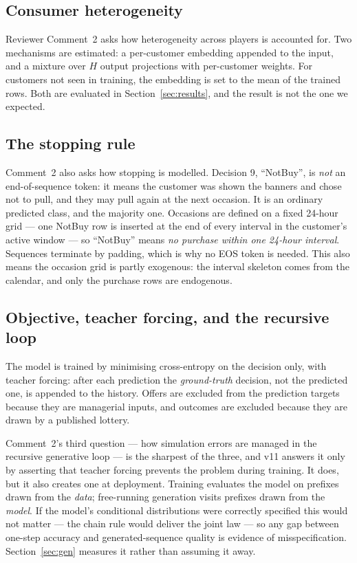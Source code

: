 \documentclass[11pt]{article}
\begin{document}
\subsection*{Consumer heterogeneity}

Reviewer Comment~2 asks how heterogeneity across players is accounted for. Two
mechanisms are estimated: a per-customer embedding appended to the input, and a
mixture over $H$ output projections with per-customer weights. For customers not
seen in training, the embedding is set to the mean of the trained rows. Both are
evaluated in Section~\ref{sec:results}, and the result is not the one we
expected.

\subsection*{The stopping rule}

Comment~2 also asks how stopping is modelled. Decision 9, ``NotBuy'', is
\emph{not} an end-of-sequence token: it means the customer was shown the
banners and chose not to pull, and they may pull again at the next occasion. It
is an ordinary predicted class, and the majority one. Occasions are defined on a
fixed 24-hour grid --- one NotBuy row is inserted at the end of every interval
in the customer's active window --- so ``NotBuy'' means \emph{no purchase within
one 24-hour interval}. Sequences terminate by padding, which is why no EOS token
is needed. This also means the occasion grid is partly exogenous: the interval
skeleton comes from the calendar, and only the purchase rows are endogenous.

\subsection*{Objective, teacher forcing, and the recursive loop}

The model is trained by minimising cross-entropy on the decision only, with
teacher forcing: after each prediction the \emph{ground-truth} decision, not the
predicted one, is appended to the history. Offers are excluded from the
prediction targets because they are managerial inputs, and outcomes are excluded
because they are drawn by a published lottery.

Comment~2's third question --- how simulation errors are managed in the
recursive generative loop --- is the sharpest of the three, and v11 answers it
only by asserting that teacher forcing prevents the problem during training. It
does, but it also creates one at deployment. Training evaluates the model on
prefixes drawn from the \emph{data}; free-running generation visits prefixes
drawn from the \emph{model}. If the model's conditional distributions were
correctly specified this would not matter --- the chain rule would deliver the
joint law --- so any gap between one-step accuracy and generated-sequence
quality is evidence of misspecification. Section~\ref{sec:gen} measures it
rather than assuming it away.
\end{document}

